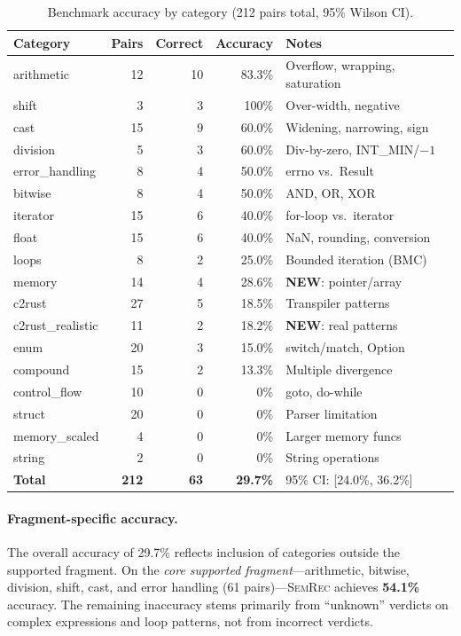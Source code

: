 \documentclass[11pt]{article}
\newcommand{\semrec}{\textsc{SemRec}}
\begin{document}
\begin{table}[t]
\centering
\caption{Benchmark accuracy by category (212 pairs total, 95\% Wilson CI).}\label{tab:bench}
\begin{tabular}{@{}lrrrl@{}}
\toprule
\textbf{Category} & \textbf{Pairs} & \textbf{Correct} & \textbf{Accuracy} & \textbf{Notes} \\
\midrule
arithmetic       & 12  & 10 & 83.3\% & Overflow, wrapping, saturation \\
shift            &  3  &  3 & 100\%  & Over-width, negative \\
cast             & 15  &  9 & 60.0\% & Widening, narrowing, sign \\
division         &  5  &  3 & 60.0\% & Div-by-zero, INT\_MIN/$-1$ \\
error\_handling  &  8  &  4 & 50.0\% & errno vs.\ Result \\
bitwise          &  8  &  4 & 50.0\% & AND, OR, XOR \\
iterator         & 15  &  6 & 40.0\% & for-loop vs.\ iterator \\
float            & 15  &  6 & 40.0\% & NaN, rounding, conversion \\
loops            &  8  &  2 & 25.0\% & Bounded iteration (BMC) \\
memory           & 14  &  4 & 28.6\% & \textbf{NEW}: pointer/array \\
c2rust           & 27  &  5 & 18.5\% & Transpiler patterns \\
c2rust\_realistic& 11  &  2 & 18.2\% & \textbf{NEW}: real patterns \\
enum             & 20  &  3 & 15.0\% & switch/match, Option \\
compound         & 15  &  2 & 13.3\% & Multiple divergence \\
control\_flow    & 10  &  0 &  0\%   & goto, do-while \\
struct           & 20  &  0 &  0\%   & Parser limitation \\
memory\_scaled   &  4  &  0 &  0\%   & Larger memory funcs \\
string           &  2  &  0 &  0\%   & String operations \\
\midrule
\textbf{Total}   & \textbf{212} & \textbf{63} & \textbf{29.7\%} & 95\% CI: [24.0\%, 36.2\%] \\
\bottomrule
\end{tabular}
\end{table}

\paragraph{Fragment-specific accuracy.}
The overall accuracy of 29.7\% reflects inclusion of categories outside the
supported fragment.  On the \emph{core supported fragment}---arithmetic,
bitwise, division, shift, cast, and error handling (61 pairs)---\semrec{}
achieves \textbf{54.1\%} accuracy.  The remaining inaccuracy stems primarily
from ``unknown'' verdicts on complex expressions and loop patterns, not from
incorrect verdicts.
\end{document}
